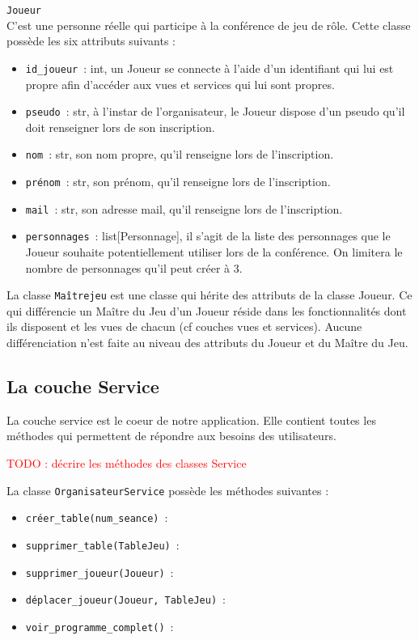 \documentclass[11pt]{article}
\begin{document}
\texttt{Joueur}\\
C'est une personne réelle qui participe à la conférence de jeu de rôle. Cette classe possède les six attributs suivants :
\begin{itemize}[label=, font=\small]
    \item \texttt{id\_joueur}~: int, un Joueur se connecte à l'aide d'un identifiant qui lui est propre afin d'accéder aux vues et services qui lui sont propres.
    \item \texttt{pseudo}~: str, à l'instar de l'organisateur, le Joueur dispose d'un pseudo qu'il doit renseigner lors de son inscription.
    \item \texttt{nom}~: str, son nom propre, qu'il renseigne lors de l'inscription.
    \item \texttt{prénom}~: str, son prénom, qu'il renseigne lors de l'inscription.
    \item \texttt{mail}~: str, son adresse mail, qu'il renseigne lors de l'inscription.
    \item \texttt{personnages}~: list[Personnage], il s'agit de la liste des personnages que le Joueur souhaite potentiellement utiliser lors de la conférence. On limitera le nombre de personnages qu'il peut créer à 3.
\end{itemize}

\bigbreak

La classe \texttt{Maîtrejeu} est une classe qui hérite des attributs de la classe Joueur. Ce qui différencie un Maître du Jeu d'un Joueur réside dans les fonctionnalités dont ils disposent et les vues de chacun (cf couches vues et services). Aucune différenciation n'est faite au niveau des attributs du Joueur et du Maître du Jeu.







\subsection{La couche Service}

La couche service est le coeur de notre application. Elle contient toutes les méthodes qui permettent de répondre aux besoins des utilisateurs.



\textcolor{red}{TODO : décrire les méthodes des classes Service}


\bigbreak


La classe \texttt{OrganisateurService} possède les méthodes suivantes :
\begin{itemize}[label=, font=\small]
    \item \texttt{créer\_table(num_seance)}~: 
    \item \texttt{supprimer\_table(TableJeu)}~: 
    \item \texttt{supprimer\_joueur(Joueur)}~: 
    \item \texttt{déplacer\_joueur(Joueur, TableJeu)}~: 
    \item \texttt{voir\_programme\_complet()}~: 
\end{itemize}
\end{document}
